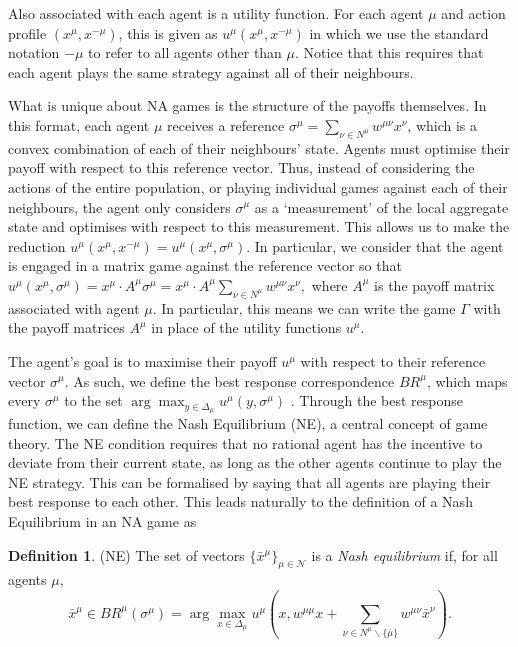 \documentclass{article}
\theoremstyle{definition}
\newtheorem{definition}{Definition}
\newcommand{\agentset}{\mathcal{N}}
\newcommand{\utility}[1]{u^{#1}}
\newcommand{\wmunu}{w^{\mu \nu}}
\newcommand{\xmu}{x^{\mu}}
\newcommand{\xnu}{x^{\nu}}
\newcommand{\refmu}{\sigma^{\mu}}
\newcommand{\NE}[1]{\bar{x}^{#1}}
\newcommand{\weightedsum}{ \sum_{\nu \in N^\mu} \wmunu \xnu}
\newcommand{\xnotmu}{x^{-\mu}}
\begin{document}
Also associated with each agent is a utility
function. For each agent $\mu$ and action profile
$(\xmu, \xnotmu)$, this is given as $u^\mu(\xmu, \xnotmu)$ in which we
use the standard notation $-\mu$ to refer to all agents other than
$\mu$. Notice that this requires that each agent plays the same
strategy against all of their neighbours. 

What is unique about 
NA games is the structure of the payoffs themselves. In this format,
each agent $\mu$ receives a reference $\sigma^{\mu} = \sum_{\nu \in N^\mu} \wmunu \xnu$, which is a convex combination
of each of their neighbours' state. Agents must optimise their payoff with respect to this
reference vector. Thus, instead of considering
the actions of the entire population, or playing individual games
against each of their neighbours, the agent only considers
$\sigma^\mu$ as a `measurement' of the local aggregate state and
optimises with respect to this measurement. This allows us to make
the reduction $u^\mu(\xmu, \xnotmu) = u^\mu(\xmu, \refmu)$. In
particular, we consider that the agent is engaged in a matrix game
against the reference vector so that
$
	u^\mu(\xmu, \refmu) = \xmu \cdot A^\mu \refmu = \xmu
	\cdot A^\mu \weightedsum,
$
%
where $A^\mu$ is the payoff matrix associated with agent $\mu$. In particular,  this means we can write the game $\Gamma$ with the payoff
matrices $A^\mu$ in place of the utility functions
$\utility{\mu}$. 

The agent's goal
is to maximise their payoff $u^\mu$ with respect to their reference vector $\refmu$. As
such, we define the best response correspondence $BR^\mu$, which maps
every $\refmu$ to the set $\arg \max_{y \in \Delta_\mu} {u^\mu(y,
	\refmu)}$ \cite{Ostrovski2014}. Through the best response function, we can define the Nash Equilibrium (NE), a central concept of game theory. The NE condition requires that no rational agent has the incentive to deviate
from their current state, as long as the other agents continue to play the NE strategy. This can be formalised by saying that all
agents are playing their best response to each other.
%
This leads naturally to the definition of a Nash Equilibrium in an NA game as
%
\begin{definition}(NE) \label{def::NE}
	The set of vectors $\{ \NE{\mu}\}_{\mu \in \agentset}$ is a {\em
		Nash equilibrium} if, for all agents $\mu$,
	\begin{equation*}
		\NE{\mu} \in BR^\mu (\refmu) = \arg \max_{x \in \Delta_\mu} u^\mu(x, w^{\mu \mu} x + \sum_{\nu \in N^\mu \backslash \{\bar{\mu}\}} \wmunu \NE{\nu}).
	\end{equation*} 
\end{definition}
\end{document}
